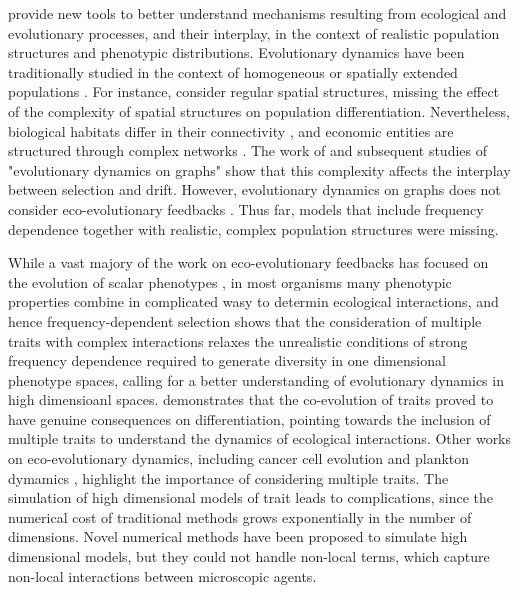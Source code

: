  provide new tools to better understand mechanisms resulting from ecological and evolutionary processes, and their interplay, in the context of realistic population structures and phenotypic distributions.
% 
Evolutionary dynamics have been traditionally studied in the context of homogeneous or spatially extended populations \cite{LiebermanHauert2005}.
% 
For instance, \cite{Slatkin1973,Slatkin1978,Kirkpatrick1997,Polechova2015,Polechova2018,AndradeRestrepo2019,Doebeli2003,Meszena1997,Yeaman2011,Debarre2013,Mirrahimi2020} consider regular spatial structures, missing the effect of the complexity of spatial structures on population differentiation.
% 
Nevertheless, biological habitats differ in their connectivity \xxx, and economic entities are structured through complex networks \xxx. The work of \cite{LiebermanHauert2005} and subsequent studies of "evolutionary dynamics on graphs" \xxx show that this complexity affects the interplay between selection and drift. However, evolutionary dynamics on graphs does not consider eco-evolutionary feedbacks \cite{Govaert2019a}.
% 
Thus far, models that include frequency dependence together with realistic, complex population structures were missing.

While a vast majory of the work on eco-evolutionary feedbacks has focused on the evolution of scalar phenotypes \cite{Doebeli2011}, in most organisms many phenotypic properties combine in complicated wasy to determin ecological interactions, and hence frequency-dependent selection \cite{Doebeli2014}
% 
\cite{Doebeli2011} shows that the consideration of multiple traits with complex interactions relaxes the unrealistic conditions of strong frequency dependence required to generate diversity in one dimensional phenotype spaces, calling for a better understanding of evolutionary dynamics in high dimensioanl spaces.
% 
 demonstrates that the co-evolution of traits proved to have genuine consequences on differentiation, pointing towards the inclusion of multiple traits to understand the dynamics of ecological interactions.
% 
Other works on eco-evolutionary dynamics, including cancer cell evolution \xxx and plankton dymamics \xxx, highlight the importance of considering multiple traits.
% 
The simulation of high dimensional models of trait leads to complications, since the numerical cost of traditional methods grows exponentially in the number of dimensions. 
% 
Novel numerical methods have been proposed to simulate high dimensional models, but they could not handle non-local terms, which capture non-local interactions between microscopic agents.

